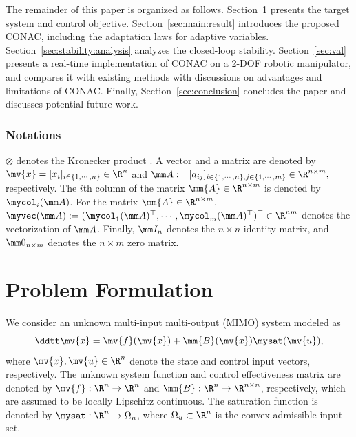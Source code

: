 \documentclass[letterpaper, journal]{IEEEtran}
\begin{document}
The remainder of this paper is organized as follows. 
Section~\ref{sec:problem:formulation} presents the target system and control objective.
Section~\ref{sec:main:result} introduces the proposed CONAC, including the adaptation laws for adaptive variables.
Section~\ref{sec:stability:analysis} analyzes the closed-loop stability.
Section~\ref{sec:val} presents a real-time implementation of CONAC on a 2-DOF robotic manipulator, and compares it with existing methods with discussions on advantages and limitations of CONAC.
Finally, Section~\ref{sec:conclusion} concludes the paper and discusses potential future work.

\subsubsection*{Notations}

$\otimes$ denotes the Kronecker product \cite[Chap. 7, Def. 7.1.2]{Bernstein:2009aa}.
A vector and a matrix are denoted by $\mv{x}=[x_i]_{i\in\{1,\cdots,n\}}\in\R^n$ and 
$
  \mm A
  := 
  [a_{ij}]_{
    i\in\{1,\cdots,n\},j\in\{1,\cdots ,m\}
  }\in\R^{n\times m}
  ,
$
respectively.
The $i$th column of the matrix $\mm{A}\in\R^{n\times m}$ is denoted by $\mycol_i(\mm A)$.
For the matrix $\mm{A}\in\R^{n\times m}$, $\myvec(\mm A):=(\mycol_1(\mm A)^\top,\cdots,\mycol_m(\mm A)^\top )^\top\in\R^{nm}$ denotes the vectorization of $\mm A$.
Finally, $\mm I_n$ denotes the $n\times n$ identity matrix, and $\mm 0_{n\times m}$ denotes the $n\times m$ zero matrix.

\section{Problem Formulation} \label{sec:problem:formulation}

We consider an unknown multi-input multi-output (MIMO) system modeled as 
\begin{equation} \label{eq:sys}
  \ddtt\mv{x} 
  = 
  \mv{f}(\mv{x}) 
  + 
  \mm{B}(\mv{x})\mysat(\mv{u})
  ,
\end{equation}
where $\mv{x},\mv{u}\in\R^n$ denote the state and control input vectors, respectively.
The unknown system function and control effectiveness matrix are denoted by $\mv{f}:\R^n\to\R^n$ and $\mm{B}:\R^n\to\R^{n\times n}$, respectively, which are assumed to be locally Lipschitz continuous.
The saturation function is denoted by $\mysat:\R^n\to\Omega_u$, where $\Omega_u\subset\R^n$ is the convex admissible input set.
\end{document}
